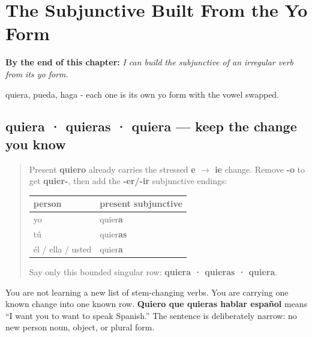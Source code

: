 
\chapter{The Subjunctive Built From the Yo Form}
\label{ch:spanish-subjuntivo-yo-stem}

\begin{chapteropening}
\textbf{By the end of this chapter:} \emph{I can build the subjunctive of an irregular verb from its yo form.}

quiera, pueda, haga - each one is its own yo form with the vowel swapped.
\end{chapteropening}

\section[quiera · quieras · quiera]{quiera · quieras · quiera — keep the change you know}

\label{lesson:ES-C18-querer-subjuntivo}



\begin{quote}
Present \textbf{quiero} already carries the stressed \textbf{e $\to$ ie} change. Remove \textbf{-o} to get \textbf{quier-}, then add the \textbf{-er/-ir} subjunctive endings:

\noindent
\begin{tabularx}{\linewidth}{@{}>{\raggedright\arraybackslash}X>{\raggedright\arraybackslash}X@{}}
\toprule
\textbf{person} & \textbf{present subjunctive} \\
\midrule
yo & quier\textbf{a} \\
tú & quier\textbf{as} \\
él / ella / usted & quier\textbf{a} \\
\bottomrule
\end{tabularx}

Say only this bounded singular row: \textbf{quiera · quieras · quiera}.
\end{quote}

\begin{grammarlens}[title={Grammar Lens: one known verb, one inherited stem}]
You are not learning a new list of stem-changing verbs. You are carrying one known change into one known row. \textbf{Quiero que quieras hablar español} means “I want you to want to speak Spanish.” The sentence is deliberately narrow: no new person noun, object, or plural form.
\end{grammarlens}


